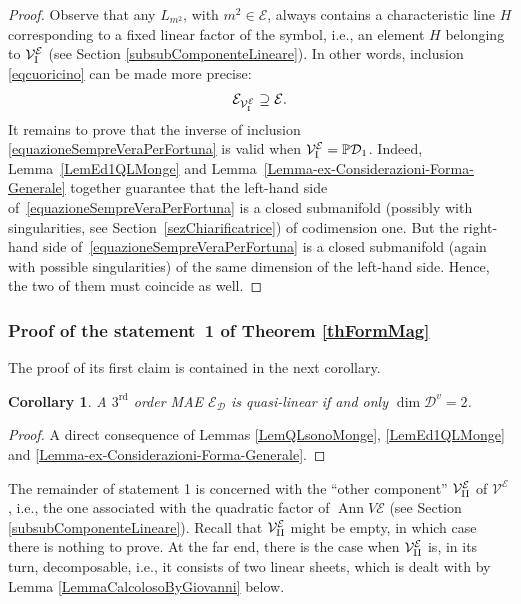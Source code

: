 \documentclass[10pt,a4paper]{amsart}
\newcommand{\D}{\mathcal{D}}
\newcommand{\M}{\mathcal{V}}
\newcommand{\MM}{\mathcal{V}_{\textrm{\normalfont I}}}
\newcommand{\MMM}{\mathcal{V}_{\textrm{\normalfont II}}}
\newcommand{\E}{\mathcal{E}}
\newcommand{\Ann}{\operatorname{Ann}}
\renewcommand{\P}{\mathbb{P}}
\newcommand{\Rd}{^\textrm{rd}}
\newcommand{\elle}{H}
\numberwithin{equation}{section}
\newtheorem{Corollary}[Theorem]{Corollary}
\begin{document}
\begin{proof}
Observe that any $L_{m^2}$, with $m^2\in\E$, always contains a characteristic line $\elle$ correspon\-ding to a f\/ixed linear factor of the symbol, i.e., an element $\elle$ belonging to $\MM^\E$ (see Section \ref{subsubComponenteLineare}). In other words, inclusion \eqref{eqcuoricino} can be made more precise:
\begin{gather}\label{equazioneSempreVeraPerFortuna}
\E_{\MM^\E}\supseteq \E.
\end{gather}
 It remains to prove that the inverse of inclusion \eqref{equazioneSempreVeraPerFortuna} is valid when $\MM^\E=\P\D_1$.
 Indeed, Lemma~\ref{LemEd1QLMonge} and Lemma~\ref{Lemma-ex-Considerazioni-Forma-Generale} together guarantee that the left-hand side of~\eqref{equazioneSempreVeraPerFortuna} is a closed submanifold (possibly with singularities, see Section~\ref{sezChiarificatrice}) of codimension one.
But the right-hand side of~\eqref{equazioneSempreVeraPerFortuna} is a closed submanifold (again with possible singularities) of the same dimension of the left-hand side. Hence, the two of them must coincide as well.
\end{proof}

\subsubsection{Proof of the statement~1 of Theorem \ref{thFormMag}}\label{SubStat1}
The proof of its f\/irst claim is contained in the next corollary.
\begin{Corollary}\label{corollariocorollarioso}
A $3\Rd$ order MAE $\E_\D$ is quasi-linear if and only $\dim\D^v=2$.
\end{Corollary}
\begin{proof}
 A direct consequence of Lemmas \ref{LemQLsonoMonge}, \ref{LemEd1QLMonge} and \ref{Lemma-ex-Considerazioni-Forma-Generale}.
\end{proof}

The remainder of statement 1 is concerned with the ``other component'' $\MMM^\E$ of $\M^\E$, i.e., the one associated with the quadratic factor of $\Ann V\E$ (see Section \ref{subsubComponenteLineare}). Recall that $\MMM^\E$ might be empty, in which case there is nothing to prove. At the far end, there is the case when $\MMM^\E$ is, in its turn, decomposable, i.e., it consists of two linear sheets, which is dealt with by Lemma \ref{LemmaCalcolosoByGiovanni} below.
\end{document}
